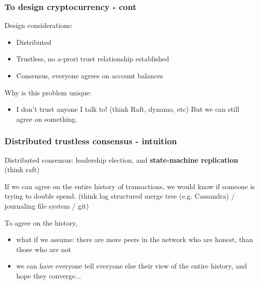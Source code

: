 \documentclass{beamer}
\begin{document}
\begin{frame}
\frametitle{To design cryptocurrency - cont}

Design considerations:
\begin{itemize}
    \item Distributed
    \item Trustless, no a-prori trust relationship established
    \item Consensus, everyone agrees on account balances
\end{itemize}

\vspace{0.3in}
Why is this problem unique:

\begin{itemize}
\item I don't trust anyone I talk to! (think Raft, dynamo, etc) But we can still agree on something.
\end{itemize}

\end{frame}

\begin{frame}
\frametitle{Distributed trustless consensus - intuition}

Distributed consensus: leadership election, and \textbf{state-machine replication}
(think raft)

\vspace{0.2in}
If we can agree on the entire history of transactions, we would know if someone is trying to double spend.
(think log structured merge tree (e.g. Cassandra) / journaling file system / git)

\vspace{0.2in}
To agree on the history,

\begin{itemize}
    \item what if we assume: there are more peers in the network who are honest, than those who are not
    \item we can have everyone tell everyone else their view of the entire history, and hope they converge...
\end{itemize}

\end{frame}
\end{document}
